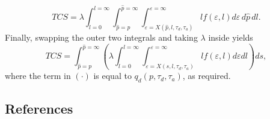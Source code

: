 \documentclass[preprint,authoryear]{elsarticle}
\newcommand{\taud}{\tau_d}
\newcommand{\taua}{\tau_a}
\newcommand{\ve}{\varepsilon}
\begin{document}
\begin{equation}
	TCS = \lambda \int_{l=0}^{l=\infty} \int_{\hat p = p}^{\hat p=\infty} \int_{\ve=X(\hat p,l,\taud,\taua)}^{\ve=\infty} l f(\ve,l)d\ve \, d\hat{p}\, dl.
\end{equation}
Finally, swapping the outer two integrals and taking $\lambda$ inside yields
\begin{equation}
	TCS = \int_{\hat{p}=p}^{\hat{p}=\infty} \left( \lambda \int_{l=0}^{l=\infty} 
		\int_{\ve=X(s,l,\taud,\taua)}^{\ve=\infty} lf(\ve,l)d\ve
	dl \right) ds,
\end{equation}
where the term in $(\cdot)$ is equal to $q_d(p,\taud,\taua)$, as required.


\pagebreak
\subsection*{References}


\end{document}
